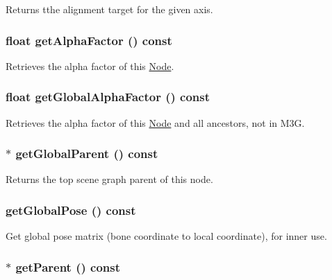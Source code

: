 Returns tthe alignment target for the given axis. \hypertarget{classm3g_1_1Node_bf7e8f9d9f530274aaf27e69910f8689}{
\subsubsection[{getAlphaFactor}]{\setlength{\rightskip}{0pt plus 5cm}float getAlphaFactor () const}}
\label{classm3g_1_1Node_bf7e8f9d9f530274aaf27e69910f8689}


Retrieves the alpha factor of this \hyperlink{classm3g_1_1Node}{Node}. \hypertarget{classm3g_1_1Node_f48a25661cb8a6f3559f7d5ffbc520b3}{
\subsubsection[{getGlobalAlphaFactor}]{\setlength{\rightskip}{0pt plus 5cm}float getGlobalAlphaFactor () const}}
\label{classm3g_1_1Node_f48a25661cb8a6f3559f7d5ffbc520b3}


Retrieves the alpha factor of this \hyperlink{classm3g_1_1Node}{Node} and all ancestors, not in M3G. \hypertarget{classm3g_1_1Node_895a7a11e91762ed5aa2b849449d503a}{
\subsubsection[{getGlobalParent}]{ $\ast$ getGlobalParent () const}}
\label{classm3g_1_1Node_895a7a11e91762ed5aa2b849449d503a}


Returns the top scene graph parent of this node. \hypertarget{classm3g_1_1Node_b50dd3f0331a71cf820bbd1edc894ef0}{
\subsubsection[{getGlobalPose}]{ getGlobalPose () const}}
\label{classm3g_1_1Node_b50dd3f0331a71cf820bbd1edc894ef0}


Get global pose matrix (bone coordinate to local coordinate), for inner use. \hypertarget{classm3g_1_1Node_ce26c2757f265bc6038e6818d2eb6ad9}{
\subsubsection[{getParent}]{ $\ast$ getParent () const}}
\label{classm3g_1_1Node_ce26c2757f265bc6038e6818d2eb6ad9}


